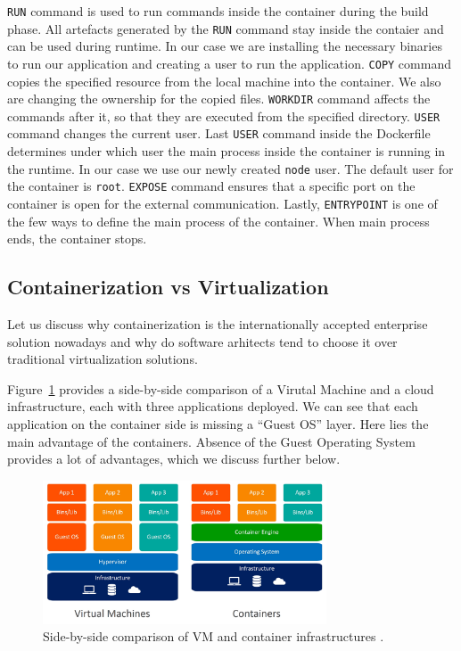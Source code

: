 \lstinline{RUN} command is used to run commands inside the container during the build phase. All artefacts generated by the \lstinline{RUN} command stay inside the contaier and can be used during runtime. In our case we are installing the necessary binaries to run our application and creating a user to run the application. \lstinline{COPY} command copies the specified resource from the local machine into the container. We also are changing the ownership for the copied files. \lstinline{WORKDIR} command affects the commands after it, so that they are executed from the specified directory. \lstinline{USER} command changes the current user. Last \lstinline{USER} command inside the Dockerfile determines under which user the main process inside the container is running in the runtime. In our case we use our newly created \lstinline{node} user. The default user for the container is \lstinline{root}. \lstinline{EXPOSE} command ensures that a specific port on the container is open for the external communication. Lastly, \lstinline{ENTRYPOINT} is one of the few ways to define the main process of the container. When main process ends, the container stops.

\subsection{Containerization vs Virtualization}

Let us discuss why containerization is the internationally accepted enterprise solution nowadays and why do software arhitects tend to choose it over traditional virtualization solutions.

Figure~\ref{img:containers-vs-virtual-machines} provides a side-by-side comparison of a Virutal Machine and a cloud infrastructure, each with three applications deployed. We can see that each application on the container side is missing a ``Guest OS'' layer. Here lies the main advantage of the containers. Absence of the Guest Operating System provides a lot of advantages, which we discuss further below.

\begin{figure}[!hbt]
	\begin{center}
		\includegraphics[width=0.75\textwidth]{images/containers-vs-virtual-machines.jpg}
        \caption{Side-by-side comparison of VM and container infrastructures \cite{datacamp-kubernetes-vs-docker}.}
		\label{img:containers-vs-virtual-machines}
	\end{center}
\end{figure}

